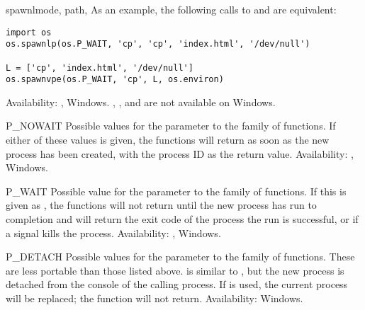 \begin{funcdesc}{spawnl}{mode, path, \moreargs}
As an example, the following calls to  and
 are equivalent:

\begin{verbatim}
import os
os.spawnlp(os.P_WAIT, 'cp', 'cp', 'index.html', '/dev/null')

L = ['cp', 'index.html', '/dev/null']
os.spawnvpe(os.P_WAIT, 'cp', L, os.environ)
\end{verbatim}

Availability: \UNIX, Windows.  ,
,  and 
are not available on Windows.
\end{funcdesc}

\begin{datadesc}{P_NOWAIT}
Possible values for the  parameter to the 
family of functions.  If either of these values is given, the
 functions will return as soon as the new process
has been created, with the process ID as the return value.
Availability: \UNIX, Windows.
\end{datadesc}

\begin{datadesc}{P_WAIT}
Possible value for the  parameter to the 
family of functions.  If this is given as , the
 functions will not return until the new process
has run to completion and will return the exit code of the process the
run is successful, or  if a signal kills the
process.
Availability: \UNIX, Windows.
\end{datadesc}

\begin{datadesc}{P_DETACH}
Possible values for the  parameter to the
 family of functions.  These are less portable than
those listed above.
 is similar to , but the new
process is detached from the console of the calling process.
If  is used, the current process will be replaced;
the  function will not return.
Availability: Windows.
\end{datadesc}

